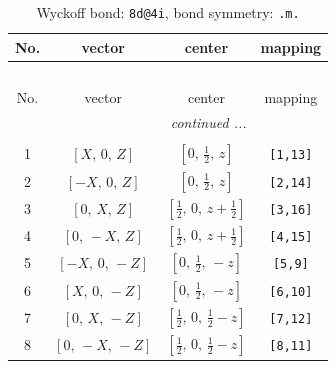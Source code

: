 \documentclass[fleqn,8pt]{jsarticle}
\begin{document}
\renewcommand{\arraystretch}{1.2}
\begin{longtable}{cccc}
\caption{Wyckoff bond: {\tt 8d@4i}, bond symmetry: {\tt .m.}}
 \\
 \hline \hline
No. & vector & center & mapping \\ \hline \endfirsthead

\multicolumn{3}{l}{\tablename\ \thetable{}} \\
 \hline \hline
No. & vector & center & mapping \\ \hline \endhead

 \hline \hline
\multicolumn{3}{r}{\footnotesize\it continued ...} \\ \endfoot

 \hline \hline
\multicolumn{3}{r}{} \\ \endlastfoot

1 & $\left[ X,\, 0,\, Z \right]$ & $\left[ 0,\, \frac{1}{2},\, z \right]$ & {\tt [1,13]} \\ \hline
2 & $\left[ - X,\, 0,\, Z \right]$ & $\left[ 0,\, \frac{1}{2},\, z \right]$ & {\tt [2,14]} \\ \hline
3 & $\left[ 0,\, X,\, Z \right]$ & $\left[ \frac{1}{2},\, 0,\, z + \frac{1}{2} \right]$ & {\tt [3,16]} \\ \hline
4 & $\left[ 0,\, - X,\, Z \right]$ & $\left[ \frac{1}{2},\, 0,\, z + \frac{1}{2} \right]$ & {\tt [4,15]} \\ \hline
5 & $\left[ - X,\, 0,\, - Z \right]$ & $\left[ 0,\, \frac{1}{2},\, - z \right]$ & {\tt [5,9]} \\ \hline
6 & $\left[ X,\, 0,\, - Z \right]$ & $\left[ 0,\, \frac{1}{2},\, - z \right]$ & {\tt [6,10]} \\ \hline
7 & $\left[ 0,\, X,\, - Z \right]$ & $\left[ \frac{1}{2},\, 0,\, \frac{1}{2} - z \right]$ & {\tt [7,12]} \\ \hline
8 & $\left[ 0,\, - X,\, - Z \right]$ & $\left[ \frac{1}{2},\, 0,\, \frac{1}{2} - z \right]$ & {\tt [8,11]} \\
\end{longtable}
\renewcommand{\arraystretch}{1.2}
\end{document}
